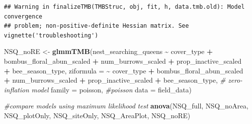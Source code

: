 \documentclass[
]{article}
\newenvironment{Shaded}{\begin{snugshade}}{\end{snugshade}}
\newcommand{\AttributeTok}[1]{\textcolor[rgb]{0.13,0.29,0.53}{#1}}
\newcommand{\CommentTok}[1]{\textcolor[rgb]{0.56,0.35,0.01}{\textit{#1}}}
\newcommand{\FunctionTok}[1]{\textcolor[rgb]{0.13,0.29,0.53}{\textbf{#1}}}
\newcommand{\NormalTok}[1]{#1}
\newcommand{\OtherTok}[1]{\textcolor[rgb]{0.56,0.35,0.01}{#1}}
\newcommand{\SpecialCharTok}[1]{\textcolor[rgb]{0.81,0.36,0.00}{\textbf{#1}}}
\begin{document}
\begin{verbatim}
## Warning in finalizeTMB(TMBStruc, obj, fit, h, data.tmb.old): Model convergence
## problem; non-positive-definite Hessian matrix. See vignette('troubleshooting')
\end{verbatim}

\begin{Shaded}
\begin{Highlighting}[]
\NormalTok{NSQ\_noRE }\OtherTok{\textless{}{-}} \FunctionTok{glmmTMB}\NormalTok{(nest\_searching\_queens }\SpecialCharTok{\textasciitilde{}}\NormalTok{ cover\_type }\SpecialCharTok{+} 
\NormalTok{                    bombus\_floral\_abun\_scaled }\SpecialCharTok{+} 
\NormalTok{                    num\_burrows\_scaled }\SpecialCharTok{+} 
\NormalTok{                    prop\_inactive\_scaled }\SpecialCharTok{+}
\NormalTok{                    bee\_season\_type, }
                  \AttributeTok{ziformula =} \SpecialCharTok{\textasciitilde{}}\NormalTok{ cover\_type }\SpecialCharTok{+} 
\NormalTok{                    bombus\_floral\_abun\_scaled }\SpecialCharTok{+} 
\NormalTok{                    num\_burrows\_scaled }\SpecialCharTok{+} 
\NormalTok{                    prop\_inactive\_scaled }\SpecialCharTok{+}
\NormalTok{                    bee\_season\_type,  }\CommentTok{\# zero{-}inflation model}
                  \AttributeTok{family =}\NormalTok{ poisson, }\CommentTok{\#poisson}
                  \AttributeTok{data =}\NormalTok{ field\_data)}

\CommentTok{\#compare models using maximum likelihood test}
\FunctionTok{anova}\NormalTok{(NSQ\_full, NSQ\_noArea, NSQ\_plotOnly, NSQ\_siteOnly, NSQ\_AreaPlot, NSQ\_noRE)}
\end{Highlighting}
\end{Shaded}
\end{document}
